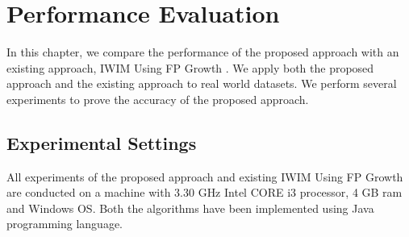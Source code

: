 


\chapter{Performance Evaluation}
\label{Chapter 4}
%
In this chapter, we compare the performance of the proposed approach with an existing approach, IWIM Using FP Growth \cite{dnd}. We apply both the proposed approach and the existing approach to real world datasets. We perform several experiments to prove the accuracy of the proposed approach. 
\section{Experimental Settings}
%
All experiments of the proposed approach and existing IWIM Using FP Growth are conducted on a machine with 3.30 GHz Intel CORE i3 processor, 4 GB ram and Windows OS. Both the algorithms have been implemented using Java programming language. 
